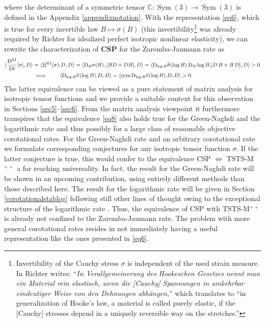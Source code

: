 \documentclass[10pt]{article}
\numberwithin{theoremCounter}{section}
\theoremstyle{plain}
\theoremstyle{definition}
\newcommand{\DD}{\mathrm{D}}
\DeclareMathOperator{\Sym}{Sym}
\DeclareMathOperator{\sym}{sym}
\DeclareMathOperator{\ZJ}{ZJ}
\def\C{\mathbb{C}}
\def\H{\mathbb{H}}
\numberwithin{equation}{section}
\begin{document}
where the determinant of a symmetric tensor $\C \colon \Sym(3) \to \Sym(3)$ is defined in the Appendix \ref{appendixnotation}. With the representation \eqref{eq6}, which is true for every invertible law $B\mapsto \sigma(B)$ (this invertibility\footnote
{
Invertibility of the Cauchy stress $\sigma$ is independent of the used strain measure. In \cite{richter1948isotrope} Richter writes: \enquote{\textsl{In Verallgemeinerung des Hookeschen Gesetzes nennt man ein Material rein elastisch, wenn die [Cauchy] Spannungen  in umkehrbar eindeutiger Weise von den Dehnungen abhängen},} which translates to \enquote{in generalization of Hooke’s law, a material is called purely elastic, if the [Cauchy] stresses depend in a uniquely reversible way on the stretches.}
}
was already required by Richter \cite{richtertranslation, richter1948isotrope, richter1949hauptaufsatze, Richter50, Richter52} for idealized perfect isotropic nonlinear elasticity), we can rewrite the characterization of \textbf{CSP} for the Zaremba-Jaumann rate as
	\begin{align}
	\langle \frac{\DD^{\rm ZJ}}{\DD t}[\sigma],D\rangle&=\langle \H^{\ZJ}(\sigma). D,D \rangle = \langle \DD_B\sigma(B).\, [BD+DB],D\rangle=\langle \DD_{\log B}\widehat{\sigma}(\log B).\DD_B \log B. [D \, B + B \, D], D \rangle >0 \notag \\
	\label{eq8}
	&\iff \qquad \langle \DD_{\log B} \widehat{\sigma}(\log B).D,D\rangle=\langle \sym \DD_{\log B}\widehat{\sigma}(\log B).D,D\rangle>0.
	\end{align}
The latter equivalence can be viewed as a pure statement of matrix analysis for isotropic tensor functions and we provide a suitable context for this observation in Sections \ref{sec5}--\ref{sec6}. From the matrix analysis viewpoint it furthermore transpires that the equivalence \eqref{eq8} also holds true for the Green-Naghdi and the logarithmic rate and thus possibly for a large class of reasonable objective corotational rates. For the Green-Naghdi rate and an arbitrary corotational rate we formulate corresponding conjectures for any isotropic tensor function $\sigma$. If the latter conjecture is true, this would confer to the equivalence CSP $\iff$ TSTS-M$^{++}$ a far reaching universality. In fact, the result for the Green-Naghdi rate will be shown in an upcoming contribution, using entirely different methods than those described here. The result for the logarithmic rate will be given in Section \ref{corotationalstablog} following still other lines of thought owing to the exceptional structure of the logarithmic rate \cite{xiao98_1}. Thus, the equivalence of CSP with TSTS-M$^{++}$ is already not confined to the Zaremba-Jaumann rate. The problem with more general corotational rates resides in not immediately having a useful representation like the ones presented in \eqref{eq6}.
\end{document}
